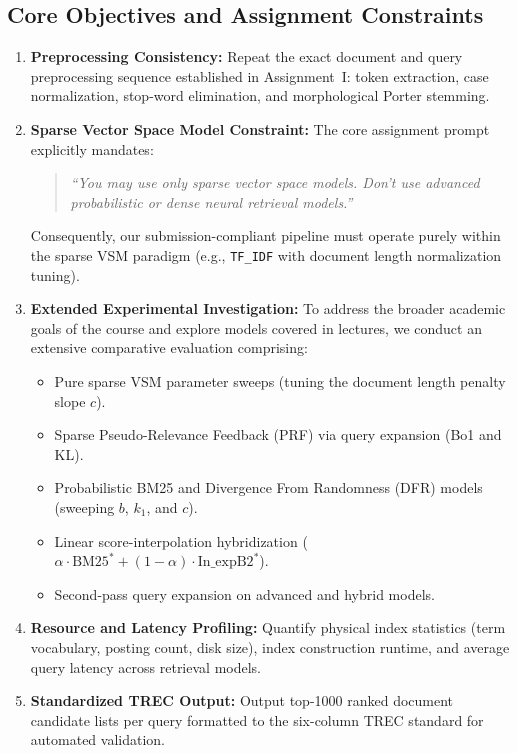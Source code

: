 \documentclass[10pt, a4paper]{article}
\begin{document}
\subsection{Core Objectives and Assignment Constraints}
\begin{enumerate}[noitemsep,topsep=2pt]
    \item \textbf{Preprocessing Consistency:} Repeat the exact document and query preprocessing sequence established in Assignment~I: token extraction, case normalization, stop-word elimination, and morphological Porter stemming.
    \item \textbf{Sparse Vector Space Model Constraint:} The core assignment prompt explicitly mandates:
    \begin{quote}
    \textit{``You may use only sparse vector space models. Don't use advanced probabilistic or dense neural retrieval models.''}
    \end{quote}
    Consequently, our submission-compliant pipeline must operate purely within the sparse VSM paradigm (e.g., \texttt{TF\_IDF} with document length normalization tuning).
    \item \textbf{Extended Experimental Investigation:} To address the broader academic goals of the course and explore models covered in lectures, we conduct an extensive comparative evaluation comprising:
    \begin{itemize}[noitemsep]
        \item Pure sparse VSM parameter sweeps (tuning the document length penalty slope $c$).
        \item Sparse Pseudo-Relevance Feedback (PRF) via query expansion (Bo1 and KL).
        \item Probabilistic BM25 and Divergence From Randomness (DFR) models (sweeping $b$, $k_1$, and $c$).
        \item Linear score-interpolation hybridization ($\alpha \cdot \text{BM25}^* + (1-\alpha) \cdot \text{In\_expB2}^*$).
        \item Second-pass query expansion on advanced and hybrid models.
    \end{itemize}
    \item \textbf{Resource and Latency Profiling:} Quantify physical index statistics (term vocabulary, posting count, disk size), index construction runtime, and average query latency across retrieval models.
    \item \textbf{Standardized TREC Output:} Output top-1000 ranked document candidate lists per query formatted to the six-column TREC standard for automated validation.
\end{enumerate}
\end{document}
